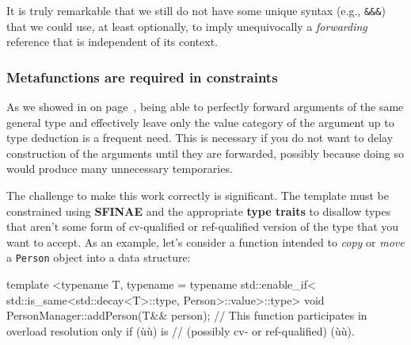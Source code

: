 \noindent It is truly remarkable that we still do not have some unique syntax
(e.g., \texttt{\&\&\&}) that we could use, at least optionally, to imply
unequivocally a \emph{forwarding} reference that is independent of its
context.

\subsubsection[Metafunctions are required in constraints]{Metafunctions are required in constraints}\label{metafunctions-are-required-in-constraints}

As we showed in \textit{} on page~\pageref{use-cases-forwardingref}, being able to
perfectly forward arguments of the same general type and effectively
leave only the value category of the argument up to type deduction is a frequent need. This
is necessary if you do not want to delay construction of the arguments
until they are forwarded, possibly because doing so would produce many
unnecessary temporaries.

The challenge to make this work correctly is significant. The template
must be constrained using \textbf{SFINAE} and the appropriate
\textbf{type traits} to disallow types that aren't some form of
cv-qualified or ref-qualified version of the type that you want to
accept. As an example, let's consider a function intended to \emph{copy}
or \emph{move} a \texttt{Person} object into a data structure:

\begin{emcppslisting}
template <typename T, typename = typename std::enable_if<
                       std::is_same<std::decay<T>::type, Person>::value>::type>
void PersonManager::addPerson(T&& person);
    // This function participates in overload resolution only if (ù{}ù) is
    // (possibly cv- or ref-qualified) (ù{}ù).
\end{emcppslisting}

